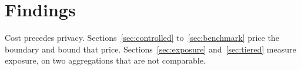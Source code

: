 \section{Findings}
\label{sec:findings}

Cost precedes privacy. Sections~\ref{sec:controlled} to~\ref{sec:benchmark} price the boundary and
bound that price. Sections~\ref{sec:exposure} and~\ref{sec:tiered} measure exposure, on two
aggregations that are not comparable.
